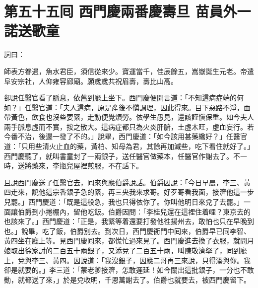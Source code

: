 
\chapter*{第五十五囘 西門慶兩番慶壽旦 苗員外一諾送歌童}


詞曰：

\begin{myquote}
師表方眷遇，魚水君臣，須信從來少。寶運當千，佳辰餘五，嵩嶽誕生元老。帝遣阜安宗社，人仰雍容廊廟。願歲歲共祝眉壽，壽比山高。

\end{myquote}

卻說任醫官看了脈息，依舊到廳上坐下。西門慶便開言道：「不知這病症端的何如？」任醫官道：「夫人這病，原是產後不愼調理，因此得來。目下惡路不淨，面帶黃色，飲食也沒些要緊，走動便覺煩勞。依學生愚見，還該謹愼保重。如今夫人兩手脈息虛而不實，按之散大。這病症都只為火炎肝腑，土虛木旺，虛血妄行。若今番不治，後邊一發了不的。」說畢，西門慶道：「如今該用甚藥纔好？」任醫官道：「只用些清火止血的藥，黃柏、知母為君，其餘再加減些，吃下看住就好了。」{}西門慶聽了，就叫書童封了一兩銀子，送任醫官做藥本，任醫官作謝去了。不一時，送將藥來，李瓶兒屋裡煎服，不在話下。

且說西門慶送了任醫官去，囘來與應伯爵說話。伯爵因說：「今日早晨，李三、黃四走來，說他這宗香銀子急的緊，再三央我來求哥。好歹哥看我面，接濟他這一步兒罷。」西門慶道：「既是這般急，我也只得依你了。你叫他明日來兌了去罷。」一面讓伯爵到小捲棚內，留他吃飯。伯爵因問：「李桂兒還在這裡住着哩？東京去的也該來了。」西門慶道：「正是，我緊等着還要打發他徃揚州去，敢怕也只在早晚到也。」說畢，吃了飯，伯爵別去。到次日，西門慶衙門中囘來，伯爵早已同李智、黃四坐在廳上等。見西門慶囘來，都慌忙過來見了。西門慶進去換了衣服，就問月娘取出徐家討的二百五十兩銀子，又添兌了二百五十兩，叫陳敬濟拏了，同到廳上，兌與李三、黃四。因說道：「我沒銀子，因應二哥再三來說，只得湊與你。我卻是就要的。」李三道：「蒙老爹接濟，怎敢遲延！如今關出這批銀子，一分也不敢動，就都送了來，」於是兌收明，千恩萬謝去了。伯爵也就要去，被西門慶留下。


